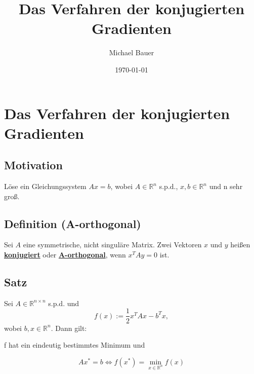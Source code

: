 \documentclass{article}
\title{Das Verfahren der konjugierten Gradienten}
\author{Michael Bauer}
\date{\today{}}
\begin{document}
\maketitle
\tableofcontents
\newpage
\large


\section*{Das Verfahren der konjugierten Gradienten}

\subsection{Motivation}
\label{sec:motivation}
Löse ein Gleichungssystem $Ax = b$, wobei $A\in\mathbb{R}^{n}$ s.p.d., $x, b\in\mathbb{R}^{n}$ und n sehr groß.

\subsection{Definition (A-orthogonal)}
Sei $A$ eine symmetrische, nicht singuläre Matrix. Zwei Vektoren $x$ und $y$ heißen \underline{\textbf{konjugiert}} oder \underline{\textbf{A-orthogonal}}, wenn $x^{T}Ay = 0$ ist.

\subsection{Satz}
Sei $A\in\mathbb{R}^{n \times n}$ s.p.d. und
\begin{equation}
f(x) := \frac 1 2 x^{T}Ax - b^{T}x,
\end{equation}
wobei $b,x \in \mathbb{R}^{n}$. Dann gilt:
\begin{center}
f hat ein eindeutig bestimmtes Minimum und
\end{center}
\begin{equation}
Ax^{*} = b \Longleftrightarrow f(x^{*}) = \underset{x\in\mathbb{R}^{n}}{\min} f(x)
\end{equation}
\end{document}

